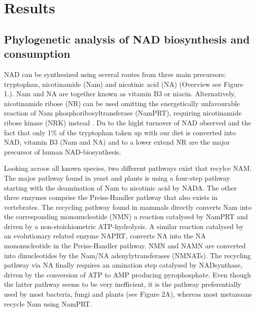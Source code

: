
\section{Results}

\subsection{Phylogenetic analysis of NAD biosynthesis and consumption}

NAD can be synthesized using several routes from three main precursors: tryptophan, nicotinamide (Nam) and nicotinic acid (NA) (Overview see Figure 1.). Nam and NA are together known as vitamin B3 or niacin. Alternatively, nicotinamide ribose (NR) can be used omitting the energetically unfavourable reaction of Nam phosphoribosyltransferase (NamPRT), requiring nicotinamide ribose kinase (NRK) instead \cite{Yoshino2018}. Du to the hight turnover of NAD observed and the fact that only 1\% of the tryptophan taken up with our diet is converted into NAD, vitamin B3 (Nam and NA) and to a lower extend NR are the major precursor of human NAD-biosynthesis.

Looking acroos all known species,   two different pathways exist that recylce NAM. The major pathway found in yeast and plants is using a four-step pathway starting with the deamination of Nam to nicotinic acid by NADA. The other three enzymes comprise the Preiss-Handler pathway that also exists in vertebrates. The recycling pathway found in mammals directly converts Nam into the corresponding mononucleotide (NMN) a reaction catalysed by NamPRT and driven by a non-stoichiometric ATP-hydrolysis. A similar reaction catalysed by an evolutionary related enzyme NAPRT, converts NA into the NA mononucleotide in the Preiss-Handler pathway. NMN and NAMN are converted into dinucleotides by the Nam/NA adenylytransferases (NMNATs). The recycling pathway via NA finally requires an amination step catalysed by NADsynthase, driven by the conversion of ATP to AMP producing pyrophosphate. Even though the latter pathway seems to be very inefficient, it is the pathway preferentially used by most bacteria, fungi and plants (see Figure 2A), whereas most metazoans recycle Nam using NamPRT.

